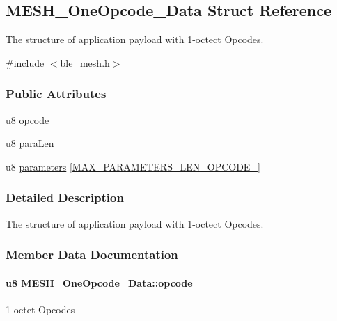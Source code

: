 \hypertarget{struct_m_e_s_h___one_opcode___data}{}\subsection{M\+E\+S\+H\+\_\+\+One\+Opcode\+\_\+\+Data Struct Reference}
\label{struct_m_e_s_h___one_opcode___data}


The structure of application payload with 1-\/octect Opcodes.  




{\ttfamily \#include $<$ble\+\_\+mesh.\+h$>$}

\subsubsection*{Public Attributes}
\begin{DoxyCompactItemize}
\item 
u8 \hyperlink{struct_m_e_s_h___one_opcode___data_a38ba2cee43d7ff2e4add09a04c02f3ef}{opcode}
\item 
u8 \hyperlink{struct_m_e_s_h___one_opcode___data_a839db720711b58134f992f17a37324fd}{para\+Len}
\item 
u8 \hyperlink{struct_m_e_s_h___one_opcode___data_a61be93265e85bd8813c7fb0e5b93a99c}{parameters} \mbox{[}\hyperlink{group___m_e_s_h___p_a_r_a_m_s___l_e_n___d_e_f_ga76e61ca4582e3e16efc7d824e241358f}{M\+A\+X\+\_\+\+P\+A\+R\+A\+M\+E\+T\+E\+R\+S\+\_\+\+L\+E\+N\+\_\+\+O\+P\+C\+O\+D\+E\+\_}\mbox{]}
\end{DoxyCompactItemize}


\subsubsection{Detailed Description}
The structure of application payload with 1-\/octect Opcodes. 

\subsubsection{Member Data Documentation}
\paragraph[{\texorpdfstring{opcode}{opcode}}]{\setlength{\rightskip}{0pt plus 5cm}u8 M\+E\+S\+H\+\_\+\+One\+Opcode\+\_\+\+Data\+::opcode}\hypertarget{struct_m_e_s_h___one_opcode___data_a38ba2cee43d7ff2e4add09a04c02f3ef}{}\label{struct_m_e_s_h___one_opcode___data_a38ba2cee43d7ff2e4add09a04c02f3ef}
1-\/octet Opcodes 
